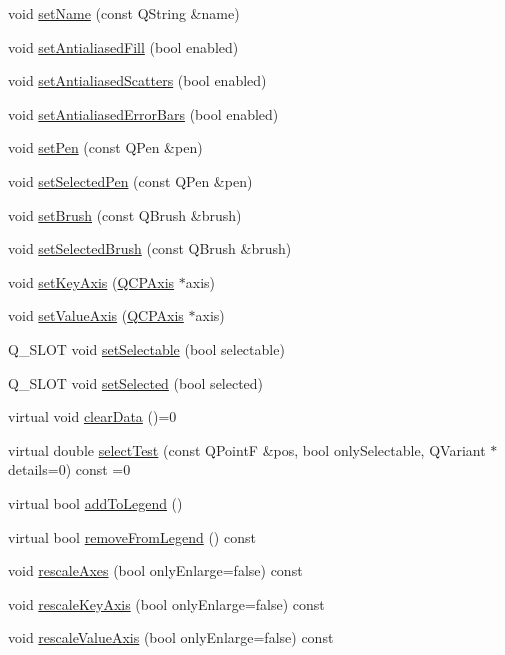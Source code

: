\begin{DoxyCompactItemize}
\item 
void \hyperlink{classQCPAbstractPlottable_ab79c7ba76bc7fa89a4b3580e12149f1f}{set\+Name} (const Q\+String \&name)
\item 
void \hyperlink{classQCPAbstractPlottable_a089d6b5577120239b55c39ed27c39536}{set\+Antialiased\+Fill} (bool enabled)
\item 
void \hyperlink{classQCPAbstractPlottable_a2f03f067ede2ed4da6f7d0e4777a3f02}{set\+Antialiased\+Scatters} (bool enabled)
\item 
void \hyperlink{classQCPAbstractPlottable_a757beb744b96cf1855cca5ab9d3ecf52}{set\+Antialiased\+Error\+Bars} (bool enabled)
\item 
void \hyperlink{classQCPAbstractPlottable_ab74b09ae4c0e7e13142fe4b5bf46cac7}{set\+Pen} (const Q\+Pen \&pen)
\item 
void \hyperlink{classQCPAbstractPlottable_a6911603cad23ab0469b108224517516f}{set\+Selected\+Pen} (const Q\+Pen \&pen)
\item 
void \hyperlink{classQCPAbstractPlottable_a7a4b92144dca6453a1f0f210e27edc74}{set\+Brush} (const Q\+Brush \&brush)
\item 
void \hyperlink{classQCPAbstractPlottable_ae8c816874089f7a44001e8618e81a9dc}{set\+Selected\+Brush} (const Q\+Brush \&brush)
\item 
void \hyperlink{classQCPAbstractPlottable_a8524fa2994c63c0913ebd9bb2ffa3920}{set\+Key\+Axis} (\hyperlink{classQCPAxis}{Q\+C\+P\+Axis} $\ast$axis)
\item 
void \hyperlink{classQCPAbstractPlottable_a71626a07367e241ec62ad2c34baf21cb}{set\+Value\+Axis} (\hyperlink{classQCPAxis}{Q\+C\+P\+Axis} $\ast$axis)
\item 
Q\+\_\+\+S\+L\+O\+T void \hyperlink{classQCPAbstractPlottable_a22c69299eb5569e0f6bf084877a37dc4}{set\+Selectable} (bool selectable)
\item 
Q\+\_\+\+S\+L\+O\+T void \hyperlink{classQCPAbstractPlottable_afbd5428c2952f59d952e11ab5cd79176}{set\+Selected} (bool selected)
\item 
virtual void \hyperlink{classQCPAbstractPlottable_a86e5b8fd4b6ff4f4084e7ea4c573fc53}{clear\+Data} ()=0
\item 
virtual double \hyperlink{classQCPAbstractPlottable_a38efe9641d972992a3d44204bc80ec1d}{select\+Test} (const Q\+Point\+F \&pos, bool only\+Selectable, Q\+Variant $\ast$details=0) const =0
\item 
virtual bool \hyperlink{classQCPAbstractPlottable_a70f8cabfd808f7d5204b9f18c45c13f5}{add\+To\+Legend} ()
\item 
virtual bool \hyperlink{classQCPAbstractPlottable_aa1f350e510326d012b9a9c9249736c83}{remove\+From\+Legend} () const 
\item 
void \hyperlink{classQCPAbstractPlottable_a7e8fc3be43c27ccacd70a7bf9d74a5cd}{rescale\+Axes} (bool only\+Enlarge=false) const 
\item 
void \hyperlink{classQCPAbstractPlottable_a1acecfcca3e7fcda00fcbaa3c886386f}{rescale\+Key\+Axis} (bool only\+Enlarge=false) const 
\item 
void \hyperlink{classQCPAbstractPlottable_abfd0805eb1d955c0111a990246658324}{rescale\+Value\+Axis} (bool only\+Enlarge=false) const 
\end{DoxyCompactItemize}
